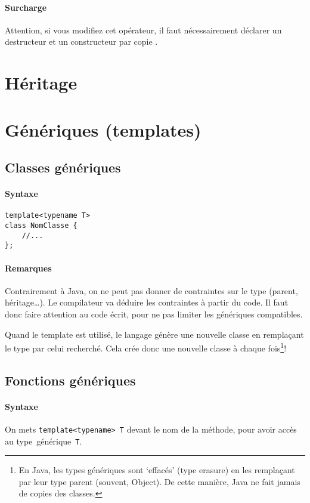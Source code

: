 \documentclass[10pt,a4paper,french]{article}
\begin{document}
\paragraph{Surcharge}
Attention, si vous modifiez cet opérateur, il faut nécessairement déclarer un destructeur  et un constructeur par copie .

\section{Héritage}

\section{Génériques (templates)}

\subsection{Classes génériques}

\paragraph{Syntaxe}
\begin{verbatim}
template<typename T>
class NomClasse {
    //...
};
\end{verbatim}

\paragraph{Remarques}
Contrairement à Java, on ne peut pas donner de contraintes sur le type (parent, héritage\ldots). Le compilateur va déduire les contraintes à partir du code. Il faut donc faire attention au code écrit, pour ne pas limiter les génériques compatibles.

Quand le template est utilisé, le langage génère une nouvelle classe en remplaçant le type par celui recherché. Cela crée donc une nouvelle classe à chaque fois\footnote{En Java, les types génériques sont `effacés' (type erasure) en les remplaçant par leur type parent (souvent, Object). De cette manière, Java ne fait jamais de copies des classes.}!

\subsection{Fonctions génériques}

\paragraph{Syntaxe}
On mets \texttt{template<typename> T} devant le nom de la méthode, pour avoir accès au type~générique~{\tt T}.
\end{document}
